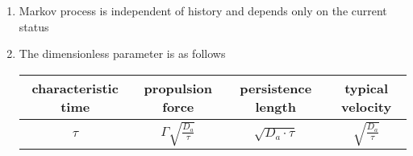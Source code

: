 \documentclass[12pt]{scrartcl}
\numberwithin{equation}{subsubsection}
\begin{document}
\begin{enumerate}
\item Markov process is independent of history and depends only on the current status

\item The dimensionless parameter is as follows
\begin{center}
    \begin{tabular}{||c|c|c|c||} 
        \hline
        characteristic time & propulsion force & persistence length & typical velocity \\
        \hline\hline
        $\tau$ & $\Gamma\sqrt{\frac{D_a}{\tau}}$ & $\sqrt{D_a\cdot\tau}$ & $\sqrt{\frac{D_a}{\tau}}$ \\
        \hline
    \end{tabular}
\end{center}

\end{enumerate}



\end{document}
